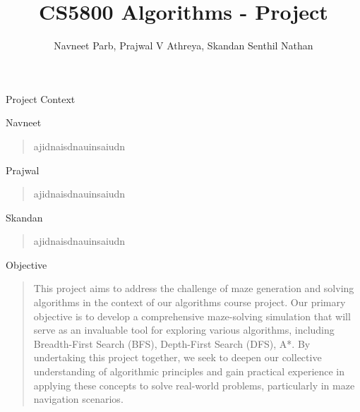 \documentclass{amsart}
\author{Navneet Parb, Prajwal V Athreya, Skandan Senthil Nathan}
\title{CS5800 Algorithms - Project}
\begin{document}
\maketitle

\begin{section}{Project Context}

    \begin{subsection}{Navneet}
        \begin{quote}
            ajidnaisdnauinsaiudn    
        \end{quote}
    \end{subsection}

    \begin{subsection}{Prajwal}
        \begin{quote}
            ajidnaisdnauinsaiudn    
        \end{quote}
    \end{subsection}

    \begin{subsection}{Skandan}
        \begin{quote}
            ajidnaisdnauinsaiudn    
        \end{quote}
    \end{subsection}
    
\end{section}

\begin{section}{Objective}
    \begin{quote}
        This project aims to address the challenge of maze generation and solving algorithms in the context of our algorithms course project. Our primary objective is to develop a comprehensive maze-solving simulation that will serve as an invaluable tool for exploring various algorithms, including Breadth-First Search (BFS), Depth-First Search (DFS), A*. By undertaking this project together, we seek to deepen our collective understanding of algorithmic principles and gain practical experience in applying these concepts to solve real-world problems, particularly in maze navigation scenarios.
    \end{quote}
\end{section}
\end{document}
